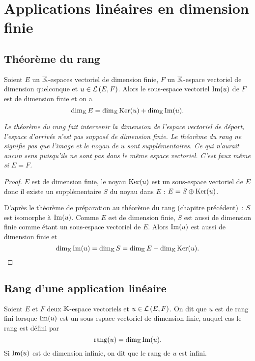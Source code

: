 \section{Applications linéaires en dimension finie}

\subsection{Théorème du rang}

\begin{theo}
  Soient $E$ un $\mathbb{K}$-espaces vectoriel de dimension finie, $F$ un $\mathbb{K}$-espace vectoriel de dimension quelconque et $u \in \mathcal{L}\left(E,F\right)$. Alors le sous-espace vectoriel $\operatorname{Im}(u)$ de $F$ est de dimension finie et on a
  \begin{equation}
    \operatorname{dim}_{\mathbb{K}} E = \operatorname{dim}_{\mathbb{K}} \operatorname{Ker}(u) + \operatorname{dim}_{\mathbb{K}} \operatorname{Im}(u).
  \end{equation}
\end{theo}

\emph{Le théorème du rang fait intervenir la dimension de l'espace vectoriel de départ, l'espace d'arrivée n'est pas supposé de dimension finie. Le théorème du rang ne signifie pas que l'image et le noyau de $u$ sont supplémentaires. Ce qui n'aurait aucun sens puisqu'ils ne sont pas dans le même espace vectoriel. C'est faux même si $E=F$.}
\begin{proof}
  $E$ est de dimension finie, le noyau $\operatorname{Ker}(u)$ est un sous-espace vectoriel de $E$ donc il existe un supplémentaire $S$ du noyau dans $E$ : $E= S \oplus \operatorname{Ker}(u)$.
  
  D'après le théorème de préparation au théorème du rang (chapitre précédent)~: $S$ est isomorphe à $\operatorname{Im}(u)$. Comme $E$ est de dimension finie, $S$ est aussi de dimension finie comme étant un sous-espace vectoriel de $E$. Alors $\operatorname{Im}(u)$ est aussi de dimension finie et 
  \begin{equation}
    \operatorname{dim}_{\mathbb{K}} \operatorname{Im}(u) = \operatorname{dim}_{\mathbb{K}} S = \operatorname{dim}_{\mathbb{K}} E - \operatorname{dim}_{\mathbb{K}} \operatorname{Ker}(u).
  \end{equation}
\end{proof}

\subsection{Rang d'une application linéaire}

\begin{defdef}
  Soient $E$ et $F$ deux $\mathbb{K}$-espace vectoriels et $u \in \mathcal{L}\left(E,F\right)$. On dit que $u$ est de rang fini lorsque $\operatorname{Im}(u)$ est un sous-espace vectoriel de dimension finie, auquel cas le rang est défini par
  \begin{equation}
    \operatorname{rang}(u) = \operatorname{dim}_{\mathbb{K}} \operatorname{Im}(u).
  \end{equation}
  Si $\operatorname{Im}(u)$ est de dimension infinie, on dit que le rang de $u$ est infini.
\end{defdef}

